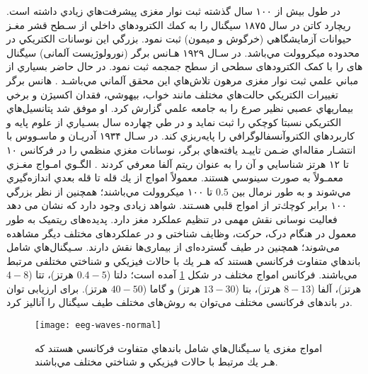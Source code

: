  در طول بيش از ۱۰۰ سال گذشته ثبت نوار مغزی 
 پيشرفت‌هاي زيادي داشته است. ريچارد كاتن
  در سال ۱۸۷۵ سيگنال
را به كمك الكترودهاي داخلي از سـطح قشر مغـز حيوانات آزمايشگاهي (خرگوش و ميمون) ثبت نمود. بزرگي اين  نوسانات الكتريكي در محدوده ميكروولت مي‌باشد. 
 در سـال ۱۹۲۹ هـانس برگر
  (نورولوژیست آلمانی) سیگنال های 
 را با کمک الکترودهای سطحی از سطح جمجمه ثبت نمود. در حال حاضر بسياري از مباني علمي ثبت نوار مغزی مرهون تلاش‌هاي اين محقق آلماني مي‌باشـد
\cite{ahmed2013finding, millet2002origins}.
هانس برگر تغييرات الكتريكي حالت‌هاي مختلف مانند خواب، بيهوشي، فقدان اكسيژن و برخي بيماريهاي عصبي نظير صرع را به جامعه علمي گزارش كرد. او موفق شد پتانسيل‌هاي الكتريكي نسبتا كوچكي را ثبت نمايد و در طي چهارده سال بسـياري از علوم پايه و كاربردهاي الكتروآنسفالوگرافي را پايه‌ريزي كند. در سـال ۱۹۳۴ آدريـان و ماسـووس با انتشـار مقاله‌اي ضـمن تاييـد يافته‌هاي برگر، نوسانات مغزي منظمي را در فرکانس ۱۰ تا ۱۲ هرتز شناسايي و آن را به عنوان ريتم آلفا معرفي كردند
\cite{ahmed2013finding, millet2002origins, adrian1934berger}.
   الگـوي امـواج مغـزي معمـولاً به صورت سينوسي هستند. معمولاً امواج از يك قله تا قله بعدي اندازه‌گيري مي‌شوند و به طور نرمال بين $0.5$ تا ۱۰۰ ميكروولت مي‌باشند؛ همچنین از نظر بزرگي ۱۰۰ برابر كوچك‌تر از امواج قلبي هسـتند. شواهد زیادی وجود دارد که نشان می دهد فعالیت نوسانی نقش مهمی در تنظیم عملکرد مغز دارد. پدیده‌های ریتمیک به طور معمول در هنگام درک، حرکت، وظایف شناختی و در عملکردهای مختلف دیگر مشاهده می‌شوند؛ همچنین در طیف گسترده‌ای از بیماری‌ها نقش دارند. سـيگنال‌هاي
 شامل باندهاي متفاوت فركانسي هستند كه هـر يك با حالات فيزيكي و شناختي مختلفی مرتبط مي‌باشند. فركانس امواج
مختلف در شكل 
\ref{fig:eegNormal}
 آمده است؛ دلتا ($0.4-5$ هرتز)، تتا ($4-8$ هرتز)، آلفا ($8-13$ هرتز)، بتا ($13-30$ هرتز) و گاما ($40-50$ هرتز).  برای ارزیابی توان در باندهای فرکانسی مختلف می‌توان به روش‌های مختلف طیف سیگنال 
 را آنالیز کرد.
\begin{figure}[t!]
    \centering
    \texttt{[image: eeg-waves-normal]}
    \caption{
امواج مغزی یا سـيگنال‌هاي
 شامل باندهاي متفاوت فركانسي هستند كه هـر يك مرتبط با حالات فيزيكي و شناختي مختلف مي‌باشند.
         }
    \label{fig:eegNormal}
\end{figure}

